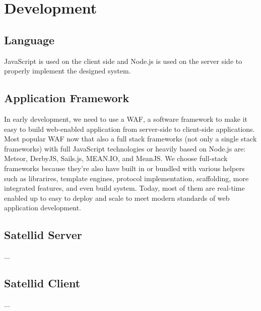 \section{Development}
\label{sec:development}

\subsection{Language}

JavaScript is used on the client side and Node.js is used on the server side to properly implement the designed system.

\subsection{Application Framework}

In early development, we need to use a \ac{WAF}, a software framework to make it easy to build web-enabled application from server-side to client-side applications.
Most popular \ac{WAF} now that also a full stack frameworks (not only a single stack frameworks) with full JavaScript technologies or heavily based on Node.js are: Meteor, DerbyJS, Sails.js, MEAN.IO, and MeanJS.
We choose full-stack frameworks because they're also have built in or bundled with various helpers such as librarires, template engines, protocol implementation, scaffolding, more integrated features, and even build system.
Today, most of them are real-time enabled up to easy to deploy and scale to meet modern standards of web application development.

\subsection{Satellid Server}

...

\subsection{Satellid Client}

...
